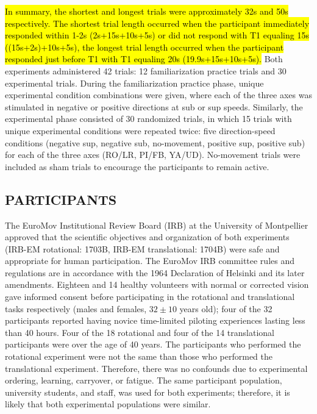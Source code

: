 \documentclass{ieeeaccess}
\begin{document}
\indent \hl{In summary, the shortest and longest trials were approximately 32s and 50s respectively. The shortest trial length occurred when the participant immediately responded within 1-2s (2s+15s+10s+5s) or did not respond with T1 equaling 15s ((15s+2s)+10s+5s), the longest trial length occurred when the participant responded just before T1 with T1 equaling 20s (19.9s+15s+10s+5s).} Both experiments administered 42 trials: 12 familiarization practice trials and 30 experimental trials. During the familiarization practice phase, unique experimental condition combinations were given, where each of the three axes was stimulated in negative or positive directions at sub or sup speeds. Similarly, the experimental phase consisted of 30 randomized trials, in which 15 trials with unique experimental conditions were repeated twice: five direction-speed conditions (negative sup, negative sub, no-movement, positive sup, positive sub) for each of the three axes (RO/LR, PI/FB, YA/UD). No-movement trials were included as sham trials to encourage the participants to remain active.

\subsection{PARTICIPANTS}
The EuroMov Institutional Review Board (IRB) at the University of Montpellier approved that the scientific objectives and organization of both experiments (IRB-EM rotational: 1703B, IRB-EM translational: 1704B) were safe and appropriate for human participation. The EuroMov IRB committee rules and regulations are in accordance with the 1964 Declaration of Helsinki and its later amendments. Eighteen and 14 healthy volunteers with normal or corrected vision gave informed consent before participating in the rotational and translational tasks respectively (males and females, $32\pm10$ years old); four of the 32 participants reported having novice time-limited piloting experiences lasting less than 40 hours. Four of the 18 rotational and four of the 14 translational participants were over the age of 40 years. The participants who performed the rotational experiment were not the same than those who performed the translational experiment. Therefore, there was no confounds due to experimental ordering, learning, carryover, or fatigue. The same participant population, university students, and staff, was used for both experiments; therefore, it is likely that both experimental populations were similar.
\end{document}
